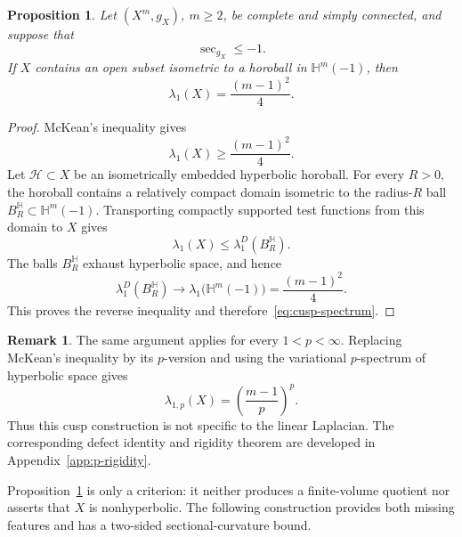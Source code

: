 \documentclass[12pt]{amsart}
\newtheorem{proposition}[theorem]{Proposition}
\theoremstyle{definition}
\newtheorem{remark}[theorem]{Remark}
\numberwithin{equation}{section}
\begin{document}
\begin{proposition}
\label{prop:hyperbolic-horoball-criterion}
Let \((X^m,g_X)\), \(m\geq2\), be complete and simply connected, and
suppose that
\[
  \sec_{g_X}\leq-1.
\]
If \(X\) contains an open subset isometric to a horoball in
\(\mathbb H^m(-1)\), then
\begin{equation}\label{eq:cusp-spectrum}
  \lambda_1(X)=\frac{(m-1)^2}{4}.
\end{equation}
\end{proposition}

\begin{proof}
McKean's inequality gives
\[
  \lambda_1(X)\geq\frac{(m-1)^2}{4}.
\]
Let \(\mathcal H\subset X\) be an isometrically embedded hyperbolic
horoball.  For every \(R>0\), the horoball contains a relatively compact
domain isometric to the radius-\(R\) ball
\(B_R^{\mathbb H}\subset\mathbb H^m(-1)\).  Transporting compactly
supported test functions from this domain to \(X\) gives
\[
  \lambda_1(X)
  \leq\lambda_1^D(B_R^{\mathbb H}).
\]
The balls \(B_R^{\mathbb H}\) exhaust hyperbolic space, and hence
\[
  \lambda_1^D(B_R^{\mathbb H})
  \longrightarrow
  \lambda_1\bigl(\mathbb H^m(-1)\bigr)
  =\frac{(m-1)^2}{4}.
\]
This proves the reverse inequality and therefore~\eqref{eq:cusp-spectrum}.
\end{proof}

\begin{remark}
\label{rem:cusp-p-spectrum}
The same argument applies for every \(1<p<\infty\).  Replacing McKean's
inequality by its \(p\)-version and using the variational
\(p\)-spectrum of hyperbolic space gives
\[
  \lambda_{1,p}(X)
  =
  \left(\frac{m-1}{p}\right)^p.
\]
Thus this cusp construction is not specific to the linear Laplacian.  The
corresponding defect identity and rigidity theorem are developed in
Appendix~\ref{app:p-rigidity}.
\end{remark}

Proposition~\ref{prop:hyperbolic-horoball-criterion} is only a criterion:
it neither produces a finite-volume quotient nor asserts that \(X\) is
nonhyperbolic.  The following construction provides both missing features
and has a two-sided sectional-curvature bound.
\end{document}

